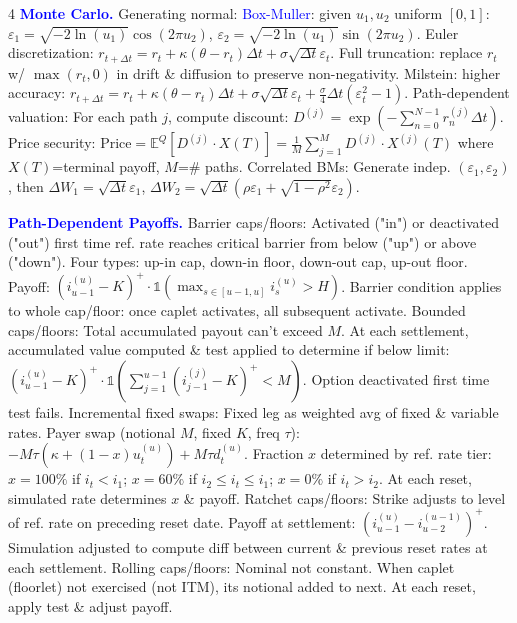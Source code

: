 \documentclass[landscape]{article}
\begin{document}
\begin{multicols}{4}
\textcolor{blue}{\textbf{Monte Carlo.}} Generating normal: \textcolor{blue}{Box-Muller}: given $u_1,u_2$ uniform $[0,1]$: $\varepsilon_1=\sqrt{-2\ln(u_1)}\cos(2\pi u_2)$, $\varepsilon_2=\sqrt{-2\ln(u_1)}\sin(2\pi u_2)$. Euler discretization: $r_{t+\Delta t}=r_t+\kappa(\theta-r_t)\Delta t+\sigma\sqrt{\Delta t}\varepsilon_t$. Full truncation: replace $r_t$ w/ $\max(r_t,0)$ in drift \& diffusion to preserve non-negativity. Milstein: higher accuracy: $r_{t+\Delta t}=r_t+\kappa(\theta-r_t)\Delta t+\sigma\sqrt{\Delta t}\varepsilon_t+\frac{\sigma}{4}\Delta t(\varepsilon_t^2-1)$. Path-dependent valuation: For each path $j$, compute discount: $D^{(j)}=\exp(-\sum_{n=0}^{N-1}r_n^{(j)}\Delta t)$. Price security: $\text{Price}=\mathbb{E}^Q[D^{(j)}\cdot X(T)]=\frac{1}{M}\sum_{j=1}^M D^{(j)}\cdot X^{(j)}(T)$ where $X(T)$=terminal payoff, $M$=\# paths. Correlated BMs: Generate indep. $(\varepsilon_1,\varepsilon_2)$, then $\Delta W_1=\sqrt{\Delta t}\varepsilon_1$, $\Delta W_2=\sqrt{\Delta t}(\rho\varepsilon_1+\sqrt{1-\rho^2}\varepsilon_2)$.

\textcolor{blue}{\textbf{Path-Dependent Payoffs.}} Barrier caps/floors: Activated ("in") or deactivated ("out") first time ref. rate reaches critical barrier from below ("up") or above ("down"). Four types: up-in cap, down-in floor, down-out cap, up-out floor. Payoff: $(i_{u-1}^{(u)}-K)^+\cdot\mathbb{1}(\max_{s\in[u-1,u]}i_s^{(u)}>H)$. Barrier condition applies to whole cap/floor: once caplet activates, all subsequent activate. Bounded caps/floors: Total accumulated payout can't exceed $M$. At each settlement, accumulated value computed \& test applied to determine if below limit: $(i_{u-1}^{(u)}-K)^+\cdot\mathbb{1}(\sum_{j=1}^{u-1}(i_{j-1}^{(j)}-K)^+<M)$. Option deactivated first time test fails. Incremental fixed swaps: Fixed leg as weighted avg of fixed \& variable rates. Payer swap (notional $M$, fixed $K$, freq $\tau$): $-M\tau(\kappa+(1-x)u_t^{(u)})+M\tau d_t^{(u)}$. Fraction $x$ determined by ref. rate tier: $x=100\%$ if $i_t<i_1$; $x=60\%$ if $i_2\leq i_t\leq i_1$; $x=0\%$ if $i_t>i_2$. At each reset, simulated rate determines $x$ \& payoff. Ratchet caps/floors: Strike adjusts to level of ref. rate on preceding reset date. Payoff at settlement: $(i_{u-1}^{(u)}-i_{u-2}^{(u-1)})^+$. Simulation adjusted to compute diff between current \& previous reset rates at each settlement. Rolling caps/floors: Nominal not constant. When caplet (floorlet) not exercised (not ITM), its notional added to next. At each reset, apply test \& adjust payoff.


\end{multicols}
\end{document}
